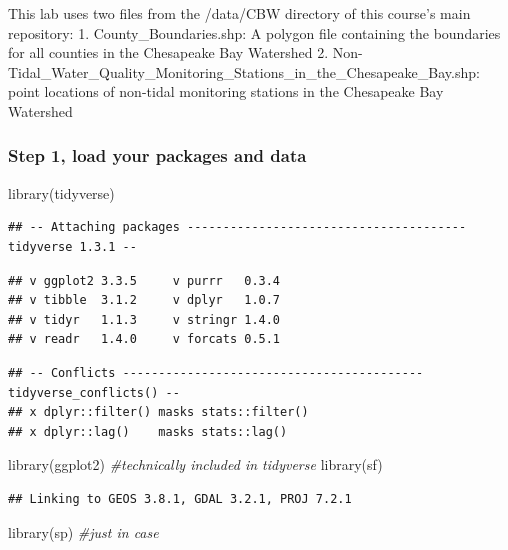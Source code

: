 \documentclass[]{article}
\newenvironment{Shaded}{\begin{snugshade}}{\end{snugshade}}
\newcommand{\CommentTok}[1]{\textcolor[rgb]{0.56,0.35,0.01}{\textit{#1}}}
\newcommand{\FunctionTok}[1]{\textcolor[rgb]{0.00,0.00,0.00}{#1}}
\newcommand{\NormalTok}[1]{#1}
\begin{document}
This lab uses two files from the /data/CBW directory of this course's
main repository: 1. County\_Boundaries.shp: A polygon file containing
the boundaries for all counties in the Chesapeake Bay Watershed 2.
Non-Tidal\_Water\_Quality\_Monitoring\_Stations\_in\_the\_Chesapeake\_Bay.shp:
point locations of non-tidal monitoring stations in the Chesapeake Bay
Watershed

\hypertarget{step-1-load-your-packages-and-data}{%
\subsubsection{Step 1, load your packages and
data}\label{step-1-load-your-packages-and-data}}

\begin{Shaded}
\begin{Highlighting}[]
\FunctionTok{library}\NormalTok{(tidyverse)}
\end{Highlighting}
\end{Shaded}

\begin{verbatim}
## -- Attaching packages --------------------------------------- tidyverse 1.3.1 --
\end{verbatim}

\begin{verbatim}
## v ggplot2 3.3.5     v purrr   0.3.4
## v tibble  3.1.2     v dplyr   1.0.7
## v tidyr   1.1.3     v stringr 1.4.0
## v readr   1.4.0     v forcats 0.5.1
\end{verbatim}

\begin{verbatim}
## -- Conflicts ------------------------------------------ tidyverse_conflicts() --
## x dplyr::filter() masks stats::filter()
## x dplyr::lag()    masks stats::lag()
\end{verbatim}

\begin{Shaded}
\begin{Highlighting}[]
\FunctionTok{library}\NormalTok{(ggplot2) }\CommentTok{\#technically included in tidyverse}
\FunctionTok{library}\NormalTok{(sf)}
\end{Highlighting}
\end{Shaded}

\begin{verbatim}
## Linking to GEOS 3.8.1, GDAL 3.2.1, PROJ 7.2.1
\end{verbatim}

\begin{Shaded}
\begin{Highlighting}[]
\FunctionTok{library}\NormalTok{(sp) }\CommentTok{\#just in case}
\end{Highlighting}
\end{Shaded}
\end{document}
